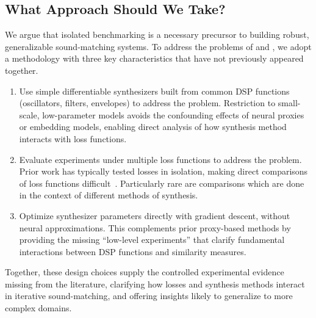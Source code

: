 \subsection{What Approach Should We Take?}
We argue that isolated benchmarking is a necessary precursor to building robust, generalizable sound-matching systems. To address the problems of \LossSelect{} and \SynthSelect{}, we adopt a methodology with three key characteristics that have not previously appeared together.

\begin{enumerate}
    \item Use simple differentiable synthesizers built from common DSP functions (oscillators, filters, envelopes) to address the \SynthSelect{} problem. Restriction to small-scale, low-parameter models avoids the confounding effects of neural proxies or embedding models, enabling direct analysis of how synthesis method interacts with loss functions. 
    \item Evaluate experiments under multiple loss functions to address the \LossSelect{} problem. Prior work has typically tested losses in isolation, making direct comparisons of loss functions difficult~\cite{vahidi2023mesostructures,han2023perceptual,uzrad2024diffmoog}. Particularly rare are comparisons which are done in the context of different methods of synthesis.  
    \item Optimize synthesizer parameters directly with gradient descent, without neural approximations. This complements prior proxy-based methods by providing the missing “low-level experiments” that clarify fundamental interactions between DSP functions and similarity measures. 
\end{enumerate}

Together, these design choices supply the controlled experimental evidence missing from the literature, 
clarifying how losses and synthesis methods interact in iterative sound-matching,
and offering insights likely to generalize to more complex domains.






